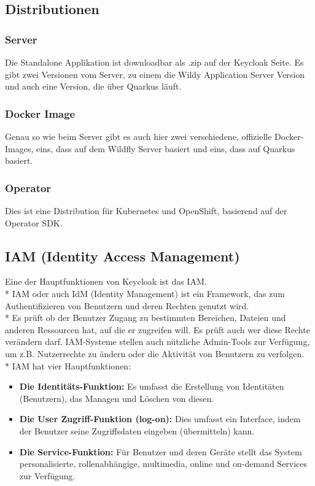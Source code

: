 \subsection{Distributionen}
\subsubsection{Server}
Die Standalone Applikation ist downloadbar als .zip auf der Keycloak Seite. Es gibt zwei Versionen vom Server, zu einem die Wildy Application Server Version und auch eine Version, die über Quarkus läuft.
\subsubsection{Docker Image}
Genau so wie beim Server gibt es auch hier zwei verschiedene, offizielle Docker-Images, eins, dass auf dem Wildfly Server basiert und eins, dass auf Quarkus basiert.
\subsubsection{Operator}
Dies ist eine Distribution für Kubernetes und OpenShift, basierend auf der Operator SDK. \cite{KeyCloakDZone}
\subsection{IAM (Identity Access Management)}
\label{sec:IAM}
Eine der Hauptfunktionen von Keycloak ist das IAM. \\*
IAM oder auch IdM (Identity Management) ist ein Framework, das zum Authentifizieren von Benutzern und deren Rechten genutzt wird. \\*
Es prüft ob der Benutzer Zugang zu bestimmten Bereichen, Dateien und anderen Ressourcen hat, auf die er zugreifen will. Es prüft auch wer diese Rechte verändern darf.
IAM-Systeme stellen auch nützliche Admin-Tools zur Verfügung, um z.B. Nutzerrechte zu ändern oder die Aktivität von Benutzern zu verfolgen. \cite{KeycloakMakeIT} \\*
IAM hat vier Hauptfunktionen:
\begin{itemize}
    \item \textbf{Die Identitäts-Funktion: }Es umfasst die Erstellung von Identitäten (Benutzern), das Managen und Löschen von diesen.  
    \item \textbf{Die User Zugriff-Funktion (log-on): } Dies umfasst ein Interface, indem der Benutzer seine Zugriffsdaten eingeben (übermitteln) kann.
    \item \textbf{Die Service-Funktion: } Für Benutzer und deren Geräte stellt das System personalisierte, rollenabhängige, multimedia, online und on-demand Services zur Verfügung. \cite{KeycloakMakeIT}
\end{itemize}

